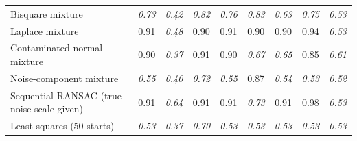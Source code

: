 \begin{table}[htbp]
{\begin{tabular}{lcccccccc}
Bisquare mixture & \textit{0.73} & \textit{0.42} & \textit{0.82} & \textit{0.76} & \textit{0.83} & \textit{0.63} & \textit{0.75} & \textit{0.53} \\
Laplace mixture & 0.91 & \textit{0.48} & 0.90 & 0.91 & 0.90 & 0.90 & 0.94 & \textit{0.53} \\
Contaminated normal mixture & 0.90 & \textit{0.37} & 0.91 & 0.90 & \textit{0.67} & \textit{0.65} & 0.85 & \textit{0.61} \\
Noise-component mixture & \textit{0.55} & \textit{0.40} & \textit{0.72} & \textit{0.55} & 0.87 & \textit{0.54} & \textit{0.53} & \textit{0.52} \\
\addlinespace
Sequential RANSAC (true noise scale given) & 0.91 & \textit{0.64} & 0.91 & 0.91 & \textit{0.73} & 0.91 & 0.98 & \textit{0.53} \\
Least squares (50 starts) & \textit{0.53} & \textit{0.37} & \textit{0.70} & \textit{0.53} & \textit{0.53} & \textit{0.53} & \textit{0.53} & \textit{0.53} \\
\bottomrule
\end{tabular}}
\end{table}